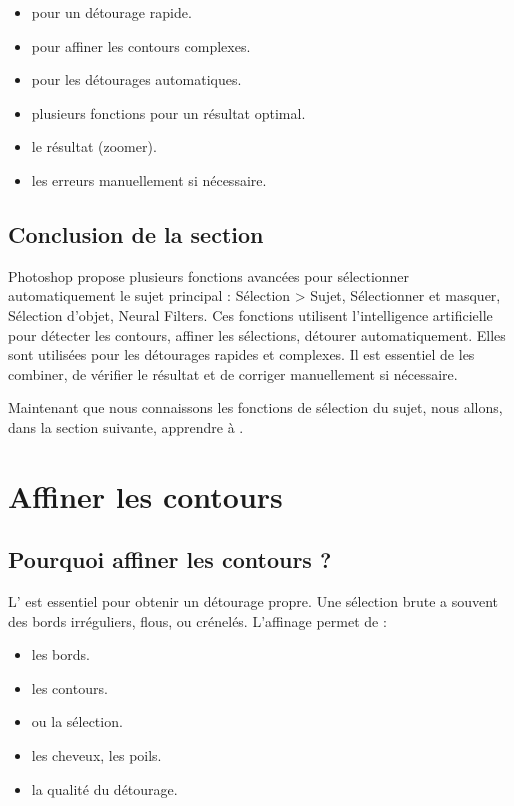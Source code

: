 \begin{itemize}
    \item {} pour un détourage rapide.
    \item {} pour affiner les contours complexes.
    \item {} pour les détourages automatiques.
    \item {} plusieurs fonctions pour un résultat optimal.
    \item {} le résultat (zoomer).
    \item {} les erreurs manuellement si nécessaire.
\end{itemize}

\subsection*{Conclusion de la section}

Photoshop propose plusieurs fonctions avancées pour sélectionner automatiquement le sujet principal : Sélection > Sujet, Sélectionner et masquer, Sélection d'objet, Neural Filters. Ces fonctions utilisent l'intelligence artificielle pour détecter les contours, affiner les sélections, détourer automatiquement. Elles sont utilisées pour les détourages rapides et complexes. Il est essentiel de les combiner, de vérifier le résultat et de corriger manuellement si nécessaire.

Maintenant que nous connaissons les fonctions de sélection du sujet, nous allons, dans la section suivante, apprendre à .

\section{Affiner les contours}

\subsection{Pourquoi affiner les contours ?}

L' est essentiel pour obtenir un détourage propre. Une sélection brute a souvent des bords irréguliers, flous, ou crénelés. L'affinage permet de :

\begin{itemize}
    \item {} les bords.
    \item {} les contours.
    \item {} ou  la sélection.
    \item {} les cheveux, les poils.
    \item {} la qualité du détourage.
\end{itemize}

